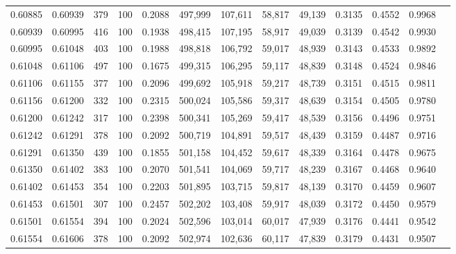 \begin{tabular}{rrrrrrrrrrrrr}
0.60885 & 0.60939 &   379 & 100 &                                     0.2088 & 497,999 & 107,611 &  58,817 &  49,139 & 0.3135 & 0.4552 & 0.9968 \\
0.60939 & 0.60995 &   416 & 100 &                                     0.1938 & 498,415 & 107,195 &  58,917 &  49,039 & 0.3139 & 0.4542 & 0.9930 \\
0.60995 & 0.61048 &   403 & 100 &                                     0.1988 & 498,818 & 106,792 &  59,017 &  48,939 & 0.3143 & 0.4533 & 0.9892 \\
0.61048 & 0.61106 &   497 & 100 &                                     0.1675 & 499,315 & 106,295 &  59,117 &  48,839 & 0.3148 & 0.4524 & 0.9846 \\
0.61106 & 0.61155 &   377 & 100 &                                     0.2096 & 499,692 & 105,918 &  59,217 &  48,739 & 0.3151 & 0.4515 & 0.9811 \\
0.61156 & 0.61200 &   332 & 100 &                                     0.2315 & 500,024 & 105,586 &  59,317 &  48,639 & 0.3154 & 0.4505 & 0.9780 \\
0.61200 & 0.61242 &   317 & 100 &                                     0.2398 & 500,341 & 105,269 &  59,417 &  48,539 & 0.3156 & 0.4496 & 0.9751 \\
0.61242 & 0.61291 &   378 & 100 &                                     0.2092 & 500,719 & 104,891 &  59,517 &  48,439 & 0.3159 & 0.4487 & 0.9716 \\
0.61291 & 0.61350 &   439 & 100 &                                     0.1855 & 501,158 & 104,452 &  59,617 &  48,339 & 0.3164 & 0.4478 & 0.9675 \\
0.61350 & 0.61402 &   383 & 100 &                                     0.2070 & 501,541 & 104,069 &  59,717 &  48,239 & 0.3167 & 0.4468 & 0.9640 \\
0.61402 & 0.61453 &   354 & 100 &                                     0.2203 & 501,895 & 103,715 &  59,817 &  48,139 & 0.3170 & 0.4459 & 0.9607 \\
0.61453 & 0.61501 &   307 & 100 &                                     0.2457 & 502,202 & 103,408 &  59,917 &  48,039 & 0.3172 & 0.4450 & 0.9579 \\
0.61501 & 0.61554 &   394 & 100 &                                     0.2024 & 502,596 & 103,014 &  60,017 &  47,939 & 0.3176 & 0.4441 & 0.9542 \\
0.61554 & 0.61606 &   378 & 100 &                                     0.2092 & 502,974 & 102,636 &  60,117 &  47,839 & 0.3179 & 0.4431 & 0.9507 \\

\end{tabular}

